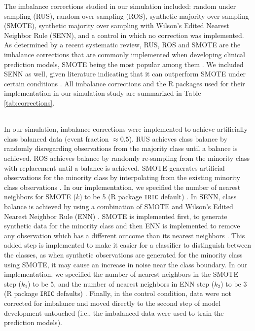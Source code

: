 \documentclass[AMA,STIX1COL,]{WileyNJD-v2}
\begin{document}
\hfill\break
The imbalance corrections studied in our simulation included: random
under sampling (RUS), random over sampling (ROS), synthetic majority
over sampling (SMOTE), synthetic majority over sampling with Wilson's
Edited Nearest Neighbor Rule (SENN), and a control in which no
correction was implemented. As determined by a recent systematic review,
RUS, ROS and SMOTE are the imbalance corrections that are commonly
implemented when developing clinical prediction models, SMOTE being the
most popular among them \citep{constanza}. We included SENN as well,
given literature indicating that it can outperform SMOTE under certain
conditions \citep{senn, heart_failure_senn}. All imbalance corrections
and the R packages used for their implementation in our simulation study
are summarized in Table \ref{tab:corrections}.\\
\strut \\
In our simulation, imbalance corrections were implemented to achieve
artificially class balanced data (event fraction \(\approx 0.5\)). RUS
achieves class balance by randomly disregarding observations from the
majority class until a balance is achieved. ROS achieves balance by
randomly re-sampling from the minority class with replacement until a
balance is achieved. SMOTE generates artificial observations for the
minority class by interpolating from the existing minority class
observations \citep{chawla}. In our implementation, we specified the
number of nearest neighbors for SMOTE (\(k\)) to be 5 (R package
\texttt{IRIC} default) \citep{iric}. In SENN, class balance is achieved
by using a combination of SMOTE and Wilson's Edited Nearest Neighbor
Rule (ENN) \citep{wilson}. SMOTE is implemented first, to generate
synthetic data for the minority class and then ENN is implemented to
remove any observation which has a different outcome than its nearest
neighbors \citep{senn}. This added step is implemented to make it easier
for a classifier to distinguish between the classes, as when synthetic
observations are generated for the minority class using SMOTE, it may
cause an increase in noise near the class boundary. In our
implementation, we specified the number of nearest neighbors in the
SMOTE step (\(k_1\)) to be 5, and the number of nearest neighbors in ENN
step (\(k_2\)) to be 3 (R package \texttt{IRIC} defaults) \citep{iric}.
Finally, in the control condition, data were not corrected for imbalance
and moved directly to the second step of model development untouched
(i.e., the imbalanced data were used to train the prediction models).\\
\end{document}
